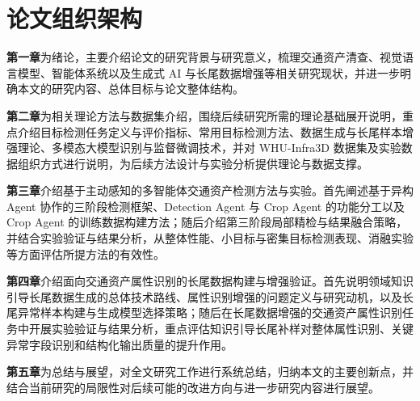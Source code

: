 \section{论文组织架构}

\textbf{第一章}为绪论，主要介绍论文的研究背景与研究意义，梳理交通资产清查、视觉语言模型、智能体系统以及生成式 AI 与长尾数据增强等相关研究现状，并进一步明确本文的研究内容、总体目标与论文整体结构。

\textbf{第二章}为相关理论方法与数据集介绍，围绕后续研究所需的理论基础展开说明，重点介绍目标检测任务定义与评价指标、常用目标检测方法、数据生成与长尾样本增强理论、多模态大模型识别与监督微调技术，并对 WHU-Infra3D 数据集及实验数据组织方式进行说明，为后续方法设计与实验分析提供理论与数据支撑。

\textbf{第三章}介绍基于主动感知的多智能体交通资产检测方法与实验。首先阐述基于异构 Agent 协作的三阶段检测框架、Detection Agent 与 Crop Agent 的功能分工以及 Crop Agent 的训练数据构建方法；随后介绍第三阶段局部精检与结果融合策略，并结合实验验证与结果分析，从整体性能、小目标与密集目标检测表现、消融实验等方面评估所提方法的有效性。

\textbf{第四章}介绍面向交通资产属性识别的长尾数据构建与增强验证。首先说明领域知识引导长尾数据生成的总体技术路线、属性识别增强的问题定义与研究动机，以及长尾异常样本构建与生成模型选择策略；随后在长尾数据增强的交通资产属性识别任务中开展实验验证与结果分析，重点评估知识引导长尾补样对整体属性识别、关键异常字段识别和结构化输出质量的提升作用。

\textbf{第五章}为总结与展望，对全文研究工作进行系统总结，归纳本文的主要创新点，并结合当前研究的局限性对后续可能的改进方向与进一步研究内容进行展望。
